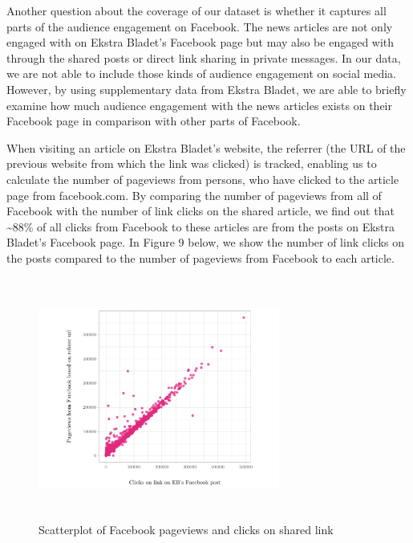 \documentclass[
]{article}
\begin{document}
\noindent Another question about the coverage of our dataset is whether
it captures all parts of the audience engagement on Facebook. The news
articles are not only engaged with on Ekstra Bladet's Facebook page but
may also be engaged with through the shared posts or direct link sharing
in private messages. In our data, we are not able to include those kinds
of audience engagement on social media. However, by using supplementary
data from Ekstra Bladet, we are able to briefly examine how much
audience engagement with the news articles exists on their Facebook page
in comparison with other parts of Facebook.

When visiting an article on Ekstra Bladet's website, the referrer (the
URL of the previous website from which the link was clicked) is tracked,
enabling us to calculate the number of pageviews from persons, who have
clicked to the article page from facebook.com. By comparing the number
of pageviews from all of Facebook with the number of link clicks on the
shared article, we find out that \textasciitilde88\% of all clicks from
Facebook to these articles are from the posts on Ekstra Bladet's
Facebook page. In Figure 9 below, we show the number of link clicks on
the posts compared to the number of pageviews from Facebook to each
article.

\begin{figure}[H]

{\centering \includegraphics[width=300px,height=300px]{paper_files/figure-latex/sidneyplot-1} 

}

\caption{Scatterplot of Facebook pageviews and clicks on shared link}\label{fig:sidneyplot}
\end{figure}
\end{document}
